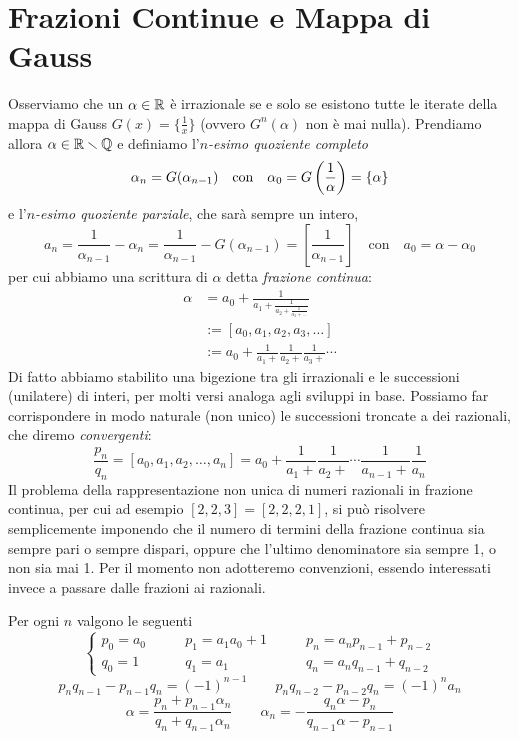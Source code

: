 \section{Frazioni Continue e Mappa di Gauss}

Osserviamo che un $\alpha\in\mathbb{R}$  \`e irrazionale se e solo se esistono tutte le iterate della mappa di Gauss $G(x)=\{\frac{1}{x}\}$ (ovvero $G^n(\alpha)$ non  \`e mai nulla). Prendiamo allora $\alpha\in\mathbb{R}\smallsetminus\mathbb{Q}$ e definiamo l'$n$\emph{-esimo quoziente completo}
\[\alpha_n=G(\alpha_{n-1}) \quad\mbox{con}\quad \alpha_0=G\left(\frac{1}{\alpha}\right)=\left\{\alpha\right\}\]
e l'$n$\emph{-esimo quoziente parziale}, che sar\`a sempre un intero,
\[a_n=\frac{1}{\alpha_{n-1}}-\alpha_n=\frac{1}{\alpha_{n-1}}-G(\alpha_{n-1})=\left[\frac{1}{\alpha_{n-1}}\right] \quad \mbox{con} \quad a_0=\alpha-\alpha_0\]
per cui abbiamo una scrittura di $\alpha$ detta \emph{frazione continua}:
\[\begin{split}
\alpha&=a_0+\frac{1}{a_1+\frac{1}{a_2+\frac{1}{a_3+\dots}}}\\
      &:=[a_0,a_1,a_2,a_3,\dots]\\
      &:=a_0+\frac{1}{a_1+}\frac{1}{a_2+}\frac{1}{a_3+}\cdots
\end{split}\]
Di fatto abbiamo stabilito una bigezione tra gli irrazionali e le successioni (unilatere) di interi, per molti versi analoga agli sviluppi in base. 
Possiamo far corrispondere in modo naturale (non unico) le successioni troncate a dei razionali, che diremo \emph{convergenti}:
\[\frac{p_n}{q_n}=[a_0,a_1,a_2,\dots,a_n]=a_0+\frac{1}{a_1+}\frac{1}{a_2+}\cdots\frac{1}{a_{n-1}+}\frac{1}{a_n}\]
Il problema della rappresentazione non unica di numeri razionali in frazione continua, per cui ad esempio $[2,2,3]=[2,2,2,1]$, 
si pu\`o risolvere semplicemente imponendo che il numero di termini della frazione continua sia sempre pari o sempre dispari, 
oppure che l'ultimo denominatore sia sempre 1, o non sia mai 1. 
Per il momento non adotteremo convenzioni, essendo interessati invece a passare dalle frazioni ai razionali.

\begin{teo} Per ogni $n$ valgono le seguenti
\[\left\{\begin{aligned}
   p_0=a_0 \qquad & p_1=a_1a_0+1 \qquad & p_{n}=a_np_{n-1}+p_{n-2}\\
   q_0=1 \qquad & q_1=a_1 \qquad & q_{n}=a_nq_{n-1}+q_{n-2}
  \end{aligned}\right.\]
\[p_nq_{n-1}-p_{n-1}q_n=(-1)^{n-1} \qquad p_nq_{n-2}-p_{n-2}q_n=(-1)^na_n\]
\[\alpha=\frac{p_n+p_{n-1}\alpha_n}{q_n+q_{n-1}\alpha_n} \qquad \alpha_n=-\frac{q_n\alpha-p_n}{q_{n-1}\alpha-p_{n-1}}\]
\end{teo}


